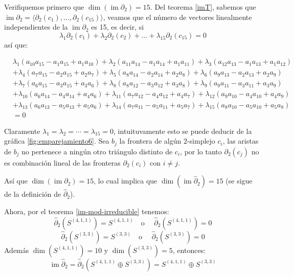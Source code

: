 \documentclass[12pt]{book}
\theoremstyle{definition}
\DeclareMathOperator{\im}{im}
\newcounter{in}
\newcounter{ini}
\begin{document}
Verifiquemos primero que $\dim(\im \partial_{2})=15$. Del teorema
\ref{imT}, sabemos que $\im \partial_{2}=\langle\partial_{2}(c_{1}),\ldots,\partial_{2}(c_{15})\rangle$,
veamos que el número de vectores linealmente independientes de la
$\im \partial_{2}$ es 15, es decir, si
$$\lambda_{1}\partial_{2}(c_{1})+\lambda_{2}\partial_{2}(c_{2})+\ldots+\lambda_{15}\partial_{2}(c_{15})=0$$
así que:

\begin{footnotesize}
  \begin{align*}
    &\lambda_{1}(a_{10}a_{15}-a_{1}a_{15}+a_{1}a_{10})+\lambda_{2}(a_{11}a_{14}-a_{1}a_{14}+a_{1}a_{11})+\lambda_{3}(a_{12}a_{13}-a_{1}a_{13}+a_{1}a_{12})\\
    &+\lambda_{4}(a_{7}a_{15}-a_{2}a_{15}+a_{2}a_{7})+\lambda_{5}(a_{8}a_{14}-a_{2}a_{14}+a_{2}a_{8})+\lambda_{6}(a_{9}a_{13}-a_{2}a_{13}+a_{2}a_{9})\\
    &+\lambda_{7}(a_{6}a_{15}-a_{3}a_{15}+a_{3}a_{6})+\lambda_{8}(a_{8}a_{12}-a_{3}a_{12}+a_{3}a_{8})+\lambda_{9}(a_{9}a_{11}-a_{3}a_{11}+a_{3}a_{9})\\
    &+\lambda_{10}(a_{6}a_{14}-a_{4}a_{14}+a_{4}a_{6})+\lambda_{11}(a_{7}a_{12}-a_{4}a_{12}+a_{4}a_{7})+\lambda_{12}(a_{9}a_{10}-a_{4}a_{10}+a_{4}a_{9})\\
    &+\lambda_{13}(a_{6}a_{13}-a_{5}a_{13}+a_{5}a_{6})+\lambda_{14}(a_{7}a_{11}-a_{5}a_{11}+a_{5}a_{7})+\lambda_{15}(a_{8}a_{10}-a_{5}a_{10}+a_{5}a_{8})\\
    &=0
  \end{align*}
\end{footnotesize}
Claramente $\lambda_{1}=\lambda_{2}=\cdots=\lambda_{15}=0$,
intuituvamente esto se puede deducir de la gráfica
\ref{fig:emparejamiento6}. Sea $b_{j}$ la frontera de algún $2$-simplejo $c_{i}$, las aristas
de $b_{j}$ no pertenece a ningún otro triángulo distinto de $c_{i}$, por
lo tanto $\partial_{2}(c_{j})$ no es combinación lineal de las fronteras
$\partial_{2}(c_{i})$ con $i\neq j$.

Así que $\dim(\im\partial_{2})=15$, lo cual implica que
$\dim(\im\widehat\partial_{2})=15$ (se sigue de la definición de
$\widehat\partial_{2}$).

Ahora, por el teorema \ref{im-mod-irreducible} tenemos:
  $$\widehat\partial_{2}(S^{(4,1,1)})=S^{(4,1,1)} \quad \mbox{o }\quad \widehat\partial_{2}(S^{(4,1,1)})=0$$
  $$\widehat\partial_{2}(S^{(3,3)})=S^{(3,3)} \quad \mbox{o }\quad \widehat\partial_{2}(S^{(3,3)})=0$$
  Además $\dim(S^{(4,1,1)})=10$ y $\dim(S^{(3,3)})=5$, entonces:
  $$\im\widehat\partial_{2}=\widehat\partial_{2}(S^{(4,1,1)}\oplus
  S^{(3,3)})=S^{(4,1,1)}\oplus S^{(3,3)}$$
\end{document}
